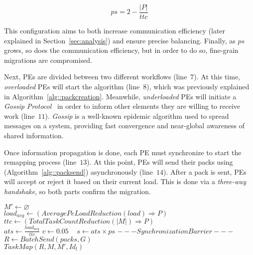 \begin{equation}
	ps = 2-\frac{|P|}{ttc}
	\label{eq:ps}
\end{equation}

This configuration aims to both increase communication efficiency (later explained in Section~\ref{sec:analysis}) and ensure precise balancing.
Finally, as $ps$ grows, so does the communication efficiency, but in order to do so, fine-grain migrations are compromised.

Next, PEs are divided between two different workflows (line~$7$).
At this time, \textit{overloaded} PEs will start the \batchassembly algorithm (line~$8$), which was previously explained in Algorithm~\ref{alg::packcreation}.
Meanwhile, \textit{underloaded} PEs will initiate a \textit{Gossip Protocol}~\cite{gossip} in order to inform other elements they are willing to receive work (line~$11$).
\textit{Gossip} is a well-known epidemic algorithm used to spread messages on a system, providing fast convergence and near-global awareness of shared information.

Once information propagation is done, each PE must synchronize to start the remapping process (line~$13$). 
At this point, PEs will send their packs using \batchsend (Algorithm~\ref{alg::packsend}) asynchronously (line~$14$).
After a pack is sent, PEs will accept or reject it based on their current load. 
This is done via a \textit{three-way handshake}, so both parts confirm the migration.

\begin{algorithm}[t]
	\DontPrintSemicolon
    $  M' \gets \varnothing$\\
    $load_{avg} \gets (AveragePeLoadReduction(load)\Rightarrow  P)$ \\
    $ttc \gets (TotalTaskCountReduction(|M|)\Rightarrow  P)$\\
    $ats\gets \frac{load_{avg}}{ttc}$ \qquad\qquad\qquad {}
    $v \gets 0.05$ \qquad \qquad\ 
    $s \gets ats\times ps$ \qquad\qquad\qquad\qquad\qquad {}
    $---Synchronization Barrier---$\\
    $R \gets BatchSend(packs, G)$\\
    $TaskMap(R,M, M',Id_{l})$
    \caption{\packdrop}
    \label{alg::packdrop}    
\end{algorithm}

